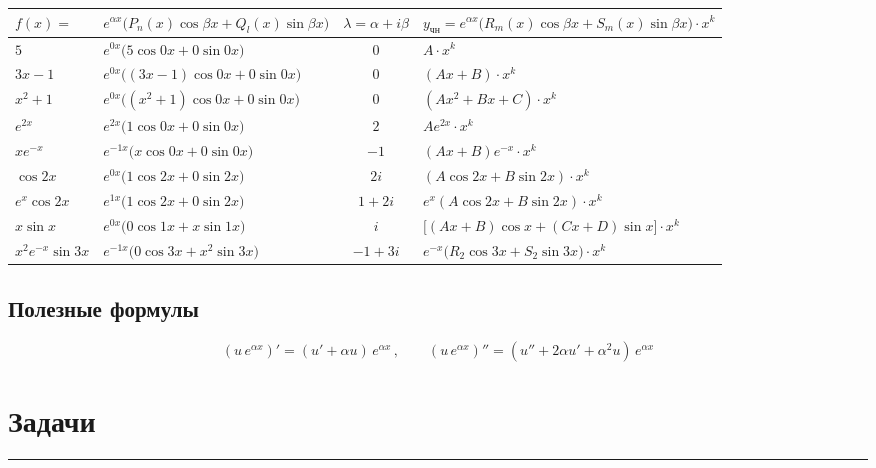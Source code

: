 \documentclass[11pt,a4paper]{article}
\newcommand{\ych}{y_{\text{чн}}}
\begin{document}
\begin{center}
\small
\renewcommand{\arraystretch}{1.4}
\begin{tabular}{@{}l l c l@{}}
\toprule
$f(x)=$ & $e^{\alpha x}\bigl(P_n(x)\cos\beta x + Q_l(x)\sin\beta x\bigr)$ & $\lambda= \alpha + i\beta$ & $\ych=e^{\alpha x}\bigl(R_m(x)\cos\beta x + S_m(x)\sin\beta x\bigr) \cdot x^k$\\
\midrule
$5$ & $e^{0x}\bigl(5\cos 0x + 0\sin 0x\bigr)$ & $0$ & $A \cdot x^k$\\
$3x - 1$ & $e^{0x}\bigl((3x-1)\cos 0x + 0\sin 0x\bigr)$ & $0$ & $(Ax + B) \cdot x^k$\\
$x^2 + 1$ & $e^{0x}\bigl((x^2+1)\cos 0x + 0\sin 0x\bigr)$ & $0$ & $(Ax^2 + Bx + C) \cdot x^k$\\
$e^{2x}$ & $e^{2x}\bigl(1\cos 0x + 0\sin 0x\bigr)$ & $2$ & $Ae^{2x} \cdot x^k$\\
$xe^{-x}$ & $e^{-1x}\bigl(x\cos 0x + 0\sin 0x\bigr)$ & $-1$ & $(Ax + B)e^{-x} \cdot x^k$\\
$\cos 2x$ & $e^{0x}\bigl(1\cos 2x + 0\sin 2x\bigr)$ & $2i$ & $(A\cos 2x + B\sin 2x) \cdot x^k$\\
$e^{x}\cos 2x$ & $e^{1x}\bigl(1\cos 2x + 0\sin 2x\bigr)$ & $1 + 2i$ & $e^{x}(A\cos 2x + B\sin 2x) \cdot x^k$\\
$x\sin x$ & $e^{0x}\bigl(0\cos 1x + x\sin 1x\bigr)$ & $i$ & $\bigl[(Ax + B)\cos x + (Cx + D)\sin x\bigr] \cdot x^k$\\
$x^2e^{-x}\sin 3x$ & $e^{-1x}\bigl(0\cos 3x + x^2\sin 3x\bigr)$ & $-1 + 3i$ & $e^{-x}\bigl(R_2\cos 3x + S_2\sin 3x\bigr) \cdot x^k$\\
\bottomrule
\end{tabular}
\end{center}

\subsection*{Полезные формулы}

\[
  \left(u\, e^{\alpha x}\right)' = (u' + \alpha u)\, e^{\alpha x}\,, \qquad
  \left(u\, e^{\alpha x}\right)'' = (u'' + 2\alpha u' + \alpha^2 u)\, e^{\alpha x}
\]

\section*{Задачи}

\medskip\hrule\medskip
\end{document}
